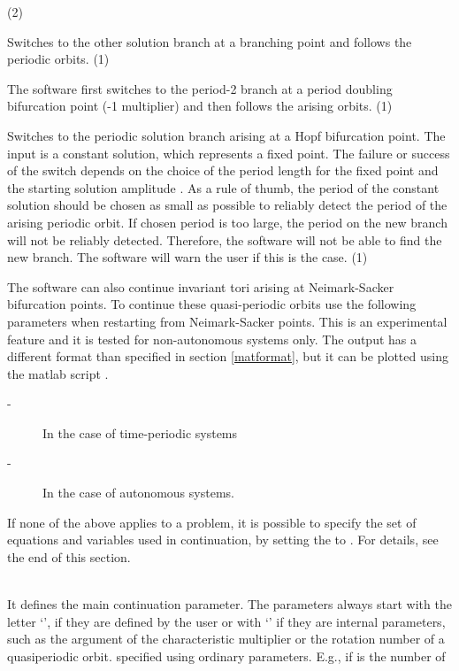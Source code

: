 \documentclass[10pt,a4paper]{ddedoc}
\begin{document}
\begin{description}
\begin{description}
(2)
%
\item[\funp{54} -] Switches to the other solution branch at a branching point and
follows the periodic orbits. (1)
%
\item[\funp{55} -] The software first switches to the period-2 branch at a
period doubling bifurcation point
(-1 multiplier) and then follows the arising orbits. (1)
%
\item[\funp{56} -] Switches to the periodic solution branch arising at a Hopf
bifurcation point. The input is a constant solution, which represents a fixed
point. The failure or success of the switch depends on the choice of the period
length for the fixed point and the starting solution amplitude .
As a rule of thumb, the period of the constant solution should be chosen as
small as possible to reliably detect the period of the arising periodic orbit.
If chosen period is too large, the period on the new branch will not be reliably detected. 
Therefore, the software will not be able to find the new branch. The software will warn 
the user if this is the case. (1)
\end{description}
The software can also continue invariant tori arising at Neimark-Sacker
bifurcation points. To continue these quasi-periodic orbits use the following
parameters when restarting from Neimark-Sacker points. This is an experimental
feature and  it is tested for non-autonomous systems only. The output has a different format
than specified in section \ref{matformat}, but it can be plotted using the matlab script 
.
\begin{description}
\item[ -] In the case of time-periodic systems
%
\item[ -] In the case of autonomous systems.
\end{description}
If none of the above applies to a problem, it is possible to specify the set of
equations and variables used in continuation, by setting the  to
. For details, see the end of this section.
%
\item[\funp{CP}] ~\\
It defines the main continuation parameter. The parameters always start with the
letter `', if they are defined by the user or with `' if they are
internal parameters, such as the argument of the characteristic multiplier or
the rotation number of a quasiperiodic orbit.
specified using ordinary parameters. E.g., if  is the number of

\end{description}
\end{document}
